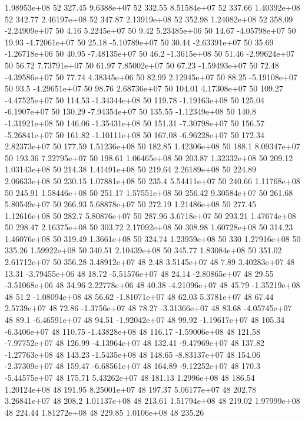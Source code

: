 1.98953e+08 52 327.45
9.6388e+07 52 332.55
8.51584e+07 52 337.66
1.40392e+08 52 342.77
2.46197e+08 52 347.87
2.13919e+08 52 352.98
1.24082e+08 52 358.09
-2.24909e+07 50 4.16
5.2245e+07 50 9.42
5.23485e+06 50 14.67
-4.05798e+07 50 19.93
-4.72061e+07 50 25.18
-5.10789e+07 50 30.44
-2.63391e+07 50 35.69
-1.26718e+06 50 40.95
-7.48135e+07 50 46.2
-1.3615e+08 50 51.46
-2.99624e+07 50 56.72
7.73791e+07 50 61.97
7.85002e+07 50 67.23
-1.59493e+07 50 72.48
-4.39586e+07 50 77.74
4.38345e+06 50 82.99
2.12945e+07 50 88.25
-5.19108e+07 50 93.5
-4.29651e+07 50 98.76
2.68736e+07 50 104.01
4.17308e+07 50 109.27
-4.47525e+07 50 114.53
-1.34344e+08 50 119.78
-1.19163e+08 50 125.04
-6.1907e+07 50 130.29
-7.94354e+07 50 135.55
-1.12349e+08 50 140.8
-1.31921e+08 50 146.06
-1.35431e+08 50 151.31
-7.30798e+07 50 156.57
-5.26841e+07 50 161.82
-1.10111e+08 50 167.08
-6.96228e+07 50 172.34
2.82373e+07 50 177.59
1.51236e+08 50 182.85
1.42306e+08 50 188.1
8.09347e+07 50 193.36
7.22795e+07 50 198.61
1.06465e+08 50 203.87
1.32332e+08 50 209.12
1.03143e+08 50 214.38
1.41491e+08 50 219.64
2.26189e+08 50 224.89
2.06633e+08 50 230.15
1.07881e+08 50 235.4
5.54411e+07 50 240.66
1.11768e+08 50 245.91
1.58446e+08 50 251.17
1.57551e+08 50 256.42
9.30584e+07 50 261.68
5.80549e+07 50 266.93
5.68878e+07 50 272.19
1.21486e+08 50 277.45
1.12616e+08 50 282.7
5.80876e+07 50 287.96
3.6718e+07 50 293.21
1.47674e+08 50 298.47
2.16375e+08 50 303.72
2.17092e+08 50 308.98
1.60728e+08 50 314.23
1.46076e+08 50 319.49
1.3661e+08 50 324.74
1.23959e+08 50 330
1.27916e+08 50 335.26
1.59922e+08 50 340.51
2.10439e+08 50 345.77
1.83084e+08 50 351.02
2.61712e+07 50 356.28
3.48912e+07 48 2.48
3.5145e+07 48 7.89
3.40283e+07 48 13.31
-3.79455e+06 48 18.72
-5.51576e+07 48 24.14
-2.80865e+07 48 29.55
-3.51068e+06 48 34.96
2.22778e+06 48 40.38
-4.21096e+07 48 45.79
-1.35219e+08 48 51.2
-1.08094e+08 48 56.62
-1.81071e+07 48 62.03
5.3781e+07 48 67.44
2.5739e+07 48 72.86
-1.3756e+07 48 78.27
-3.31366e+07 48 83.68
-4.05745e+07 48 89.1
-6.46591e+07 48 94.51
-1.92042e+07 48 99.92
-1.19617e+07 48 105.34
-6.3406e+07 48 110.75
-1.43828e+08 48 116.17
-1.59006e+08 48 121.58
-7.97752e+07 48 126.99
-4.13964e+07 48 132.41
-9.47969e+07 48 137.82
-1.27763e+08 48 143.23
-1.5435e+08 48 148.65
-8.83137e+07 48 154.06
-2.37309e+07 48 159.47
-6.68561e+07 48 164.89
-9.12252e+07 48 170.3
-5.44575e+07 48 175.71
5.43262e+07 48 181.13
1.2996e+08 48 186.54
1.20124e+08 48 191.95
8.25001e+07 48 197.37
5.06177e+07 48 202.78
3.26841e+07 48 208.2
1.01137e+08 48 213.61
1.51794e+08 48 219.02
1.97999e+08 48 224.44
1.81272e+08 48 229.85
1.0106e+08 48 235.26
